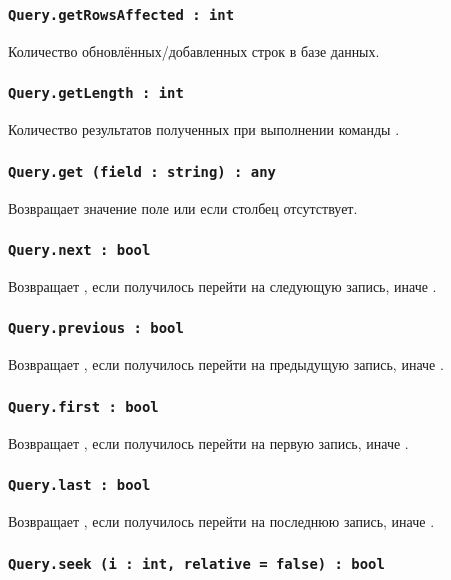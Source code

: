 \subsubsection{\lstinline|Query.getRowsAffected : int|}

Количество обновлённых/добавленных строк в базе данных.

\subsubsection{\lstinline|Query.getLength : int|}

Количество результатов полученных при выполнении команды .

\subsubsection{\lstinline|Query.get (field : string) : any|}

Возвращает значение поле или \void{} если столбец  отсутствует.

\subsubsection{\lstinline|Query.next : bool|}

Возвращает \true, если получилось перейти на следующую запись, иначе \false.

\subsubsection{\lstinline|Query.previous : bool|}

Возвращает \true, если получилось перейти на предыдущую запись, иначе \false.

\subsubsection{\lstinline|Query.first : bool|}

Возвращает \true, если получилось перейти на первую запись, иначе \false.

\subsubsection{\lstinline|Query.last : bool|}

Возвращает \true, если получилось перейти на последнюю запись, иначе \false.

\subsubsection{\lstinline|Query.seek (i : int, relative = false) : bool|}

